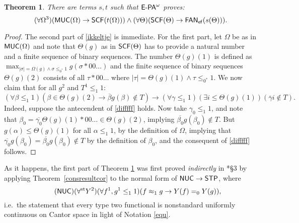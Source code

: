 \documentclass[reqno]{amsart}
\newtheorem{thm}{Theorem}
\newcommand\be{\begin{equation}}
\newcommand\ee{\end{equation}}
\def\edefi{\end{defi}}
\def\STP{\textup{\textsf{STP}}}
\def\FAN{\textup{\textsf{FAN}}}
\def\ef{\textup{\textsf{ef}}}
\def\FAN{\textup{\textsf{FAN}}}
\def\MUC{\textup{\textsf{MUC}}}
\def\st{\textup{st}}
\def\di{\rightarrow}
\def\NUC{\textup{\textsf{NUC}}}
\def\SCF{\textup{\textsf{SCF}}}
\numberwithin{equation}{section}
\numberwithin{thm}{section}
\begin{document}
\begin{thm}\label{kinkel}
There are terms $s,t$ such that $\textsf{\textup{E-PA}}^{\omega}$ proves:
\be\label{ikkeltje}
(\forall \Omega^{3})(\MUC(\Omega)\di \SCF(t(\Omega))) \wedge (\forall \Theta)(\SCF(\Theta)\di \FAN_{\ef}(s(\Theta))).
\ee
\end{thm}
\begin{proof}
The second part of \eqref{ikkeltje} is immediate.  
For the first part, let $\Omega$ be as in $\MUC(\Omega)$ and note that $\Theta(g)$ as in $\SCF(\Theta)$ has to provide a natural number and a finite sequence of binary sequences.
The number $\Theta(g)(1)$ is defined as $\max_{|\sigma|=\Omega(g)\wedge \sigma\leq_{0^{*}}1}g(\sigma*00\dots)$ and the finite sequence of binary sequences $\Theta(g)(2)$
consists of all $\tau*00\dots$ where $|\tau|=\Theta(g)(1)\wedge \tau\leq_{0^{*}}1$.  
We now claim that for all $g^{2}$ and $T^{1}\leq_{1}1$:
\be\label{difffff}
 (\forall \beta\leq_{1}1)(\beta \in \Theta(g)(2)\di \overline{\beta}{g}(\beta)\not \in T)\di (\forall \gamma\leq_{1}1)(\exists i\leq \Theta(g)(1))(\overline{\gamma}i\not \in T).
\ee
Indeed, suppose the antecendent of \eqref{difffff} holds.  Now take $\gamma_{0}\leq_{1}1$, and note that $\beta_{0}=\overline{\gamma_{0}}\Theta(g)(1)*00\dots \in \Theta(g)(2)$, implying 
$\overline{\beta_{0}}{g}(\beta_{0})\not \in T$.  But $g(\alpha)\leq \Theta(g)(1)$ for all $\alpha\leq_{1}1$, by the definition of $\Omega$, implying that $\overline{\gamma_{0}}{g}(\beta_{0})=\overline{\beta_{0}}{g}(\beta_{0})\not \in T$ by the definition of $\beta_{0}$, and the consequent of \eqref{difffff} follows.    
\end{proof}
As it happens, the first part of Theorem \ref{kinkel} was first proved \emph{indirectly} in \cite{samGH}*{\S3} by applying Theorem~\ref{consresultcor} to the normal form of $\NUC\di \STP$, where 
\be\tag{$\NUC$}
(\forall^{\st}Y^{2})(\forall f^{1}, g^{1}\leq_{1}1)(f\approx_{1}g\di Y(f)=_{0}Y(g)), 
\ee
i.e.\ the statement that every type two functional is nonstandard uniformly continuous on Cantor space in light of Notation \ref{equ}.  
\end{document}

